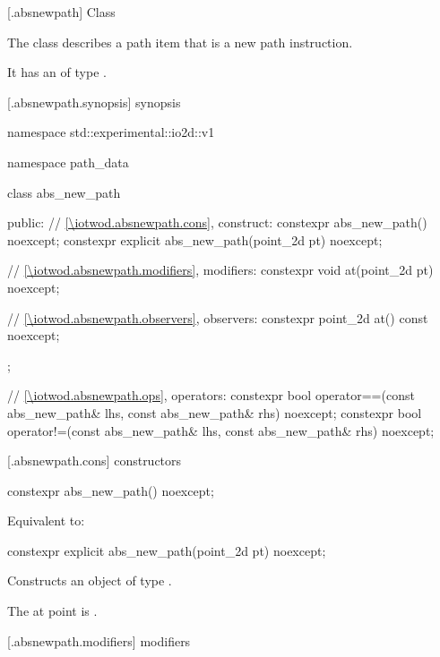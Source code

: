  [\iotwod.absnewpath] {Class }

\pnum
{}%
The class  describes a path item that is a new path instruction.

\pnum
It has an  of type .

 [\iotwod.absnewpath.synopsis] { synopsis}%

\begin{codeblock}
namespace std::experimental::io2d::v1 {
  namespace path_data {
    class abs_new_path {
    public:
      // \ref{\iotwod.absnewpath.cons}, construct:
      constexpr abs_new_path() noexcept;
      constexpr explicit abs_new_path(point_2d pt) noexcept;

      // \ref{\iotwod.absnewpath.modifiers}, modifiers:
      constexpr void at(point_2d pt) noexcept;

      // \ref{\iotwod.absnewpath.observers}, observers:
      constexpr point_2d at() const noexcept;
    };
    
    // \ref{\iotwod.absnewpath.ops}, operators:
    constexpr bool operator==(const abs_new_path& lhs, const abs_new_path& rhs) 
      noexcept;
    constexpr bool operator!=(const abs_new_path& lhs, const abs_new_path& rhs) 
      noexcept;
  }
}
\end{codeblock}

 [\iotwod.absnewpath.cons] { constructors}%

%
\begin{itemdecl}
constexpr abs_new_path() noexcept;
\end{itemdecl}
\begin{itemdescr}
\pnum
\effects
Equivalent to: 
\end{itemdescr}

%
\begin{itemdecl}
constexpr explicit abs_new_path(point_2d pt) noexcept;
\end{itemdecl}
\begin{itemdescr}
\pnum
\effects
Constructs an object of type .

\pnum
The at point is .
\end{itemdescr}

 [\iotwod.absnewpath.modifiers]{ modifiers}%

